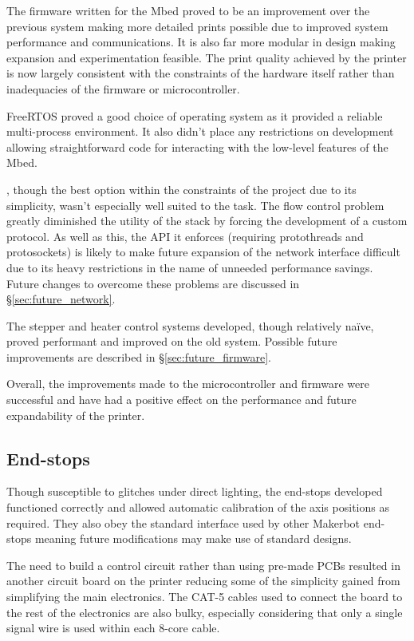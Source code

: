 			The firmware written for the Mbed proved to be an improvement over the
			previous system making more detailed prints possible due to improved
			system performance and communications. It is also far more modular in
			design making expansion and experimentation feasible. The print quality
			achieved by the printer is now largely consistent with the constraints of
			the hardware itself rather than inadequacies of the firmware or
			microcontroller.
			
			FreeRTOS proved a good choice of operating system as it provided a
			reliable multi-process environment. It also didn't place any restrictions
			on development allowing straightforward code for interacting with the
			low-level features of the Mbed.
			
			\uIP{}, though the best option within the constraints of the project due
			to its simplicity, wasn't especially well suited to the task. The flow
			control problem greatly diminished the utility of the stack by forcing the
			development of a custom protocol. As well as this, the API it enforces
			(requiring protothreads and protosockets) is likely to make future
			expansion of the network interface difficult due to its heavy
			restrictions in the name of unneeded performance savings. Future changes
			to overcome these problems are discussed in \S\ref{sec:future_network}.
			
			The stepper and heater control systems developed, though relatively
			na\"ive, proved performant and improved on the old system. Possible future
			improvements are described in \S\ref{sec:future_firmware}.
			
			Overall, the improvements made to the microcontroller and firmware were
			successful and have had a positive effect on the performance and future
			expandability of the printer.
		
		\subsection{End-stops}
			
			Though susceptible to glitches under direct lighting, the end-stops developed
			functioned correctly and allowed automatic calibration of the axis
			positions as required. They also obey the standard interface used by other
			Makerbot end-stops meaning future modifications may make use of standard
			designs.
			
			The need to build a control circuit rather than using pre-made PCBs
			resulted in another circuit board on the printer reducing some of the
			simplicity gained from simplifying the main electronics. The CAT-5 cables
			used to connect the board to the rest of the electronics are also bulky,
			especially considering that only a single signal wire is used within each
			8-core cable.
			
